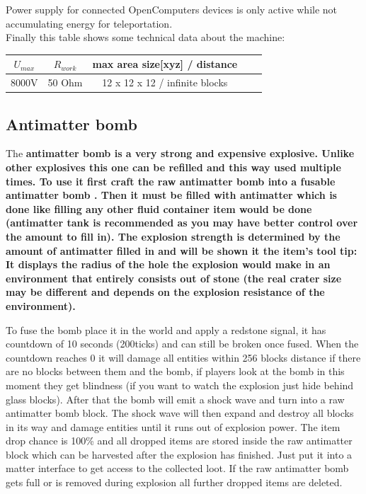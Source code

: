 \documentclass[11pt]{article} %
\begin{document}
Power supply for connected OpenComputers devices is only active while not accumulating energy for teleportation.\\

Finally this table shows some technical data about the machine: \\
\begin{tabular}{| c | c | c | c | c |} \hline
\bf $U_{max}$ & \bf $R_{work}$  & \bf max area size[xyz] / distance \\ \hline
8000V & 50 Ohm & 12 x 12 x 12 / infinite blocks \\ \hline
\end{tabular}

\subsection{Antimatter bomb}
The \bf antimatter bomb \rm is a very strong and expensive explosive. Unlike other explosives this one can be refilled and this way used multiple times. To use it first craft the \bf raw antimatter bomb \rm into a \bf fusable antimatter bomb \rm. Then it must be filled with antimatter which is done like filling any other fluid container item would be done (antimatter tank is recommended as you may have better control over the amount to fill in). The explosion strength is determined by the amount of antimatter filled in and will be shown it the item's tool tip: It displays the radius of the hole the explosion would make in an environment that entirely consists out of stone (the real crater size may be different and depends on the explosion resistance of the environment). 

To fuse the bomb place it in the world and apply a redstone signal, it has countdown of 10 seconds (200ticks) and can still be broken once fused. When the countdown reaches 0 it will damage all entities within 256 blocks distance if there are no blocks between them and the bomb, if players look at the bomb in this moment they get blindness (if you want to watch the explosion just hide behind glass blocks). After that the bomb will emit a shock wave and turn into a raw antimatter bomb block. The shock wave will then expand and destroy all blocks in its way and damage entities until it runs out of explosion power. The item drop chance is 100\% and all dropped items are stored inside the raw antimatter block which can be harvested after the explosion has finished. Just put it into a matter interface to get access to the collected loot. If the raw antimatter bomb gets full or is removed during explosion all further dropped items are deleted.
\end{document}
